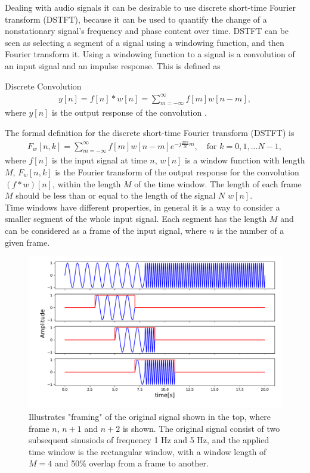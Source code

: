 \indent Dealing with audio signals it can be desirable to use discrete short-time Fourier transform (DSTFT), because it can be used to quantify the change of a nonstationary signal's frequency and phase content over time. 
DSTFT can be seen as selecting a segment of a signal using a windowing function, and then Fourier transform it. Using a windowing function to a signal is a convolution of an input signal and an impulse response. This is defined as
\begin{definition}{Discrete Convolution}
    \begin{align*}
        y[n]=f[n]*w[n]=\sum_{m=-\infty}^{\infty}f[m]w[n-m],
    \end{align*}
    where $y[n]$ is the output response of the convolution \cite{spectralaudioCH2}.
\end{definition}
The formal definition for the discrete short-time Fourier transform (DSTFT) is 
\begin{align*}
    F_w[n,k]=\sum^{\infty}_{m=-\infty}f[m]w[n-m]e^{-j\frac{2\pi k}{N}  m},\quad \text{for } k=0, 1,...  N-1,
\end{align*}
where $f[n]$ is the input signal at time $n$, $w[n]$ is a window function with length $M$, $F_w[n,k]$ is the Fourier transform of the output response for the convolution $(f*w)[n]$, within the length $M$ of the time window. The length of each frame $M$ should be less than or equal to the length of the signal $N$ $w[n]$\cite[56]{layer2015signal}. 
\\
Time windows have different properties, in general it is a way to consider a smaller segment of the whole input signal. Each segment has the length $M$ and can be considered as a frame of the input signal, where $n$ is the number of a given frame.

\begin{figure}[H]
    \centering
    \includegraphics[width=\textwidth]{figures/overlapfigure.pdf}
    \caption{Illustrates "framing" of the original signal shown in the top, where frame $n$, $n+1$ and $n+2$ is shown. The original signal consist of two subsequent sinusiods of frequency 1 Hz and 5 Hz, and the applied time window is the rectangular window, with a window length of $M=4$ and 50\% overlap from a frame to another. }
    \label{fig:overlap}
\end{figure}


